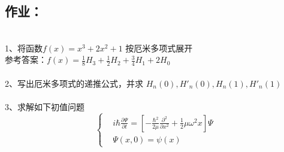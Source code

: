 \subsection{作业：}
~~~\hspace*{\fill} \\
1、将函数$f(x)=x^3+2x^2 +1$ 按厄米多项式展开\\ 
参考答案：$f(x) =\frac{1}{8} H_3 + \frac{1}{2} H_2 +\frac{3}{4} H_1 + 2 H_0 $\\
~~~\hspace*{\fill} \\
2、写出厄米多项式的递推公式，并求 $H_n(0) ,   H'_n(0) , H_n(1) ,   H'_n(1)  $\\ 
~~~\hspace*{\fill} \\
3、求解如下初值问题\\
\begin{equation*}
\left\{ 
  \begin{aligned}
   & i \hbar \frac{\partial \Psi}{\partial t}  = \left[  -\frac{\hbar ^2}{2\mu} \frac{\partial ^2}{\partial x^2} +\frac{1}{2}  \mu \omega ^2 x  \right] \Psi \\
   & \Psi(x, 0) =\psi(x)
   \end{aligned} 
\right.
\end{equation*}